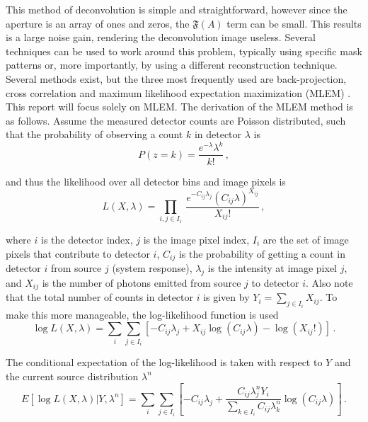 \documentclass[10pt]{article}
\begin{document}
\noindent This method of deconvolution is simple and straightforward, however since the aperture is an array of ones and zeros, the $\mathfrak{F}(A)$ term can be small. This results is a large noise gain, rendering the deconvolution image useless. Several techniques can be used to work around this problem, typically using specific mask patterns or, more importantly, by using a different reconstruction technique. Several methods exist, but the three most frequently used are back-projection, cross correlation and maximum likelihood expectation maximization (MLEM) \cite{LangeCarson1984}. This report will focus solely on MLEM. The derivation of the MLEM method is as follows. Assume the measured detector counts are Poisson distributed, such that the probability of observing a count $k$ in detector $\lambda$ is 
%
\begin{equation}
	P(z=k)  = \frac{e^{-\lambda} \lambda^k}{k!}\,,
\end{equation}

\noindent and thus the likelihood over all detector bins and image pixels is 
%
\begin{equation}
	L(X,\lambda) = \prod_{i,j\in I_i} \ \frac{e^{-C_{ij}\lambda_j} (C_{ij}\lambda)^{X_{ij}}}{X_{ij}!}\,,
\end{equation}

\noindent where $i$ is the detector index, $j$ is the image pixel index, $I_i$ are the set of image pixels that contribute to detector $i$, $C_{ij}$ is the probability of getting a count in detector $i$ from source $j$ (system response), $\lambda_j$ is the intensity at image pixel $j$, and $X_{ij}$ is the number of photons emitted from source $j$ to detector $i$. Also note that the total number of counts in detector $i$ is given by $Y_i=\sum_{j \in I_i} X_{ij}$. To make this more manageable, the log-likelihood function is used
%
\begin{equation}
	\log L(X,\lambda) = \sum_i \sum_{j \in I_i} \left[ -C_{ij} \lambda_j + X_{ij} \log (C_{ij} \lambda) - \log (X_{ij}!) \right]\,.
\end{equation}

\noindent The conditional expectation of the log-likelihood is taken with respect to $Y$ and the current source distribution $\lambda^n$
%
\begin{equation}
	E[\log L(X,\lambda) | Y,\lambda^n] = \sum_i \sum_{j \in I_i} \left[   -C_{ij} \lambda_j + \frac{C_{ij}\lambda_j^n Y_i}{\sum_{k \in I_i}C_{ij}\lambda_k^n }   \log (C_{ij} \lambda)   \right]\,.
\end{equation}
\end{document}
